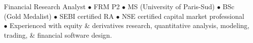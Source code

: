 \par{\vspace*{-15px}
Financial Research Analyst $\bullet$ FRM P2 $\bullet$ MS (University of Paris-Sud) $\bullet$ BSc (Gold Medalist) $\bullet$ SEBI certified RA $\bullet$ NSE certified capital market professional $\bullet$ Experienced with equity \& derivatives research, quantitative analysis, modeling, trading, \& financial software design.



}